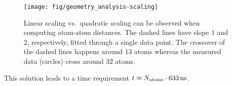 \documentclass[oribibl]{llncs}
\newcommand{\um}[1]{_{\mathrm{#1}}}
\begin{document}
%
\begin{figure}
  \begin{minipage}[c]{.990\textwidth}
	\texttt{[image: fig/geometry\_analysis-scaling]} %
  \end{minipage}\hfill
  \begin{minipage}[c]{.009\textwidth}
  \end{minipage}
  \label{fig:geometry-analysis-scaling}
  \caption{
  Linear scaling vs.~quadratic scaling can be observed when computing atom-atom distances.
  The dashed lines have slope $1$ and $2$, respectively, fitted through a single data point.
  The crossover of the dashed lines happens around $13$ atoms 
  whereas the measured data (circles) cross around $32$ atoms.
  }
\end{figure}
%
%
This solution leads to a time requirement $t \approx N\um{atoms} \cdot \unit[633]{ns}$.
\end{document}
